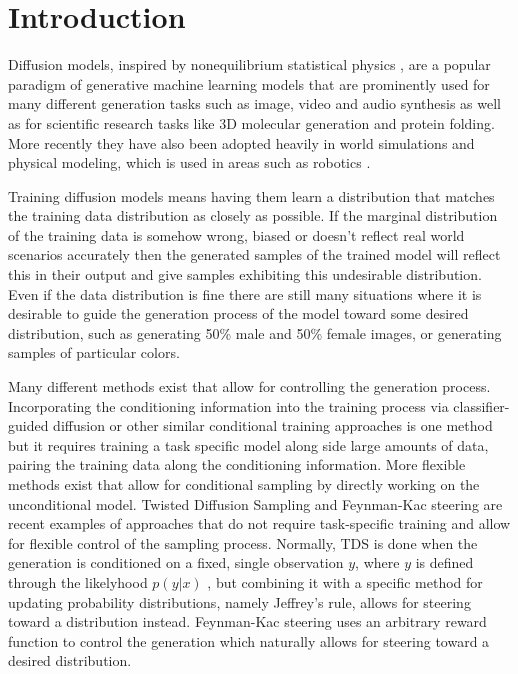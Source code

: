 \chapter{Introduction}
Diffusion models, inspired by nonequilibrium statistical physics \cite{sohldickstein2015deepunsupervisedlearningusing}, are a popular paradigm of generative machine learning models that are prominently used for many different generation tasks such as image, video and audio synthesis as well as for scientific research tasks like 3D molecular generation and protein folding. \cite{ho2020denoisingdiffusionprobabilisticmodels} \cite{rombach2022highresolutionimagesynthesislatent} \cite{ho2022videodiffusionmodels} \cite{kong2021diffwaveversatilediffusionmodel} \cite{xu2022geodiffgeometricdiffusionmodel} More recently they have also been adopted heavily in world simulations and physical modeling, which is used in areas such as robotics \cite{yang2023unisimneuralclosedloopsensor}.

Training diffusion models means having them learn a distribution that matches the training data distribution as closely as possible. If the marginal distribution of the training data is somehow wrong, biased or doesn't reflect real world scenarios accurately then the generated samples of the trained model will reflect this in their output and give samples exhibiting this undesirable distribution. Even if the data distribution is fine there are still many situations where it is desirable to guide the generation process of the model toward some desired distribution, such as generating 50\% male and 50\% female images, or generating samples of particular colors.

Many different methods exist that allow for controlling the generation process. Incorporating the conditioning information into the training process \cite{dhariwal2021diffusionmodelsbeatgans} via classifier-guided diffusion or other similar conditional training approaches is one method but it requires training a task specific model along side large amounts of data, pairing the training data along the conditioning information. More flexible methods exist that allow for conditional sampling by directly working on the unconditional model. Twisted Diffusion Sampling \cite{wu2024practicalasymptoticallyexactconditional} and Feynman-Kac steering \cite{singhal2025a} are recent examples of approaches that do not require task-specific training and allow for flexible control of the sampling process. Normally, TDS is done when the generation is conditioned on a fixed, single observation $y$, where $y$ is defined through the likelyhood $p(y|x)$ \cite{wu2024practicalasymptoticallyexactconditional}, but combining it with a specific method for updating probability distributions, namely Jeffrey's rule, allows for steering toward a distribution instead. Feynman-Kac steering uses an arbitrary reward function to control the generation which naturally allows for steering toward a desired distribution.

